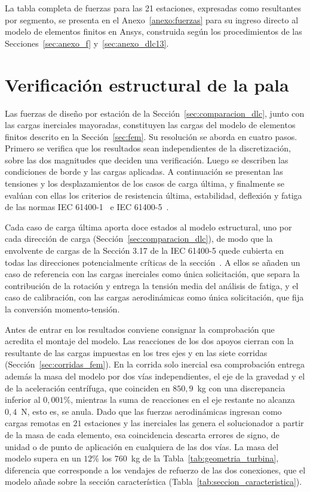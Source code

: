 La tabla completa de fuerzas para las 21 estaciones, expresadas como resultantes por segmento, se presenta en el Anexo~\ref{anexo:fuerzas} para su ingreso directo al modelo de elementos finitos en Ansys, construida según los procedimientos de las Secciones~\ref{sec:anexo_f} y~\ref{sec:anexo_dlc13}.

\section{Verificación estructural de la pala}
\label{sec:resultados_fem}

Las fuerzas de diseño por estación de la Sección~\ref{sec:comparacion_dlc}, junto con las cargas inerciales mayoradas, constituyen las cargas del modelo de elementos finitos descrito en la Sección~\ref{sec:fem}. Su resolución se aborda en cuatro pasos. Primero se verifica que los resultados sean independientes de la discretización, sobre las dos magnitudes que deciden una verificación. Luego se describen las condiciones de borde y las cargas aplicadas. A continuación se presentan las tensiones y los desplazamientos de los casos de carga última, y finalmente se evalúan con ellas los criterios de resistencia última, estabilidad, deflexión y fatiga de las normas IEC 61400-1~\parencite*{IEC61400-1} e IEC 61400-5~\parencite*{IEC61400-5}.

Cada caso de carga última aporta doce estados al modelo estructural, uno por cada dirección de carga (Sección~\ref{sec:comparacion_dlc}), de modo que la envolvente de cargas de la Sección 3.17 de la IEC 61400-5 quede cubierta en todas las direcciones potencialmente críticas de la sección~\parencite*{IEC61400-5}. A ellos se añaden un caso de referencia con las cargas inerciales como única solicitación, que separa la contribución de la rotación y entrega la tensión media del análisis de fatiga, y el caso de calibración, con las cargas aerodinámicas como única solicitación, que fija la conversión momento-tensión.

Antes de entrar en los resultados conviene consignar la comprobación que acredita el montaje del modelo. Las reacciones de los dos apoyos cierran con la resultante de las cargas impuestas en los tres ejes y en las siete corridas (Sección~\ref{sec:corridas_fem}). En la corrida solo inercial esa comprobación entrega además la masa del modelo por dos vías independientes, el eje de la gravedad y el de la aceleración centrífuga, que coinciden en $850{,}9$~kg con una discrepancia inferior al $0{,}001\%$, mientras la suma de reacciones en el eje restante no alcanza $0{,}4$~N, esto es, se anula. Dado que las fuerzas aerodinámicas ingresan como cargas remotas en $21$ estaciones y las inerciales las genera el solucionador a partir de la masa de cada elemento, esa coincidencia descarta errores de signo, de unidad o de punto de aplicación en cualquiera de las dos vías. La masa del modelo supera en un $12\%$ los $760$~kg de la Tabla~\ref{tab:geometria_turbina}, diferencia que corresponde a los vendajes de refuerzo de las dos conexiones, que el modelo añade sobre la sección característica (Tabla~\ref{tab:seccion_caracteristica}).

